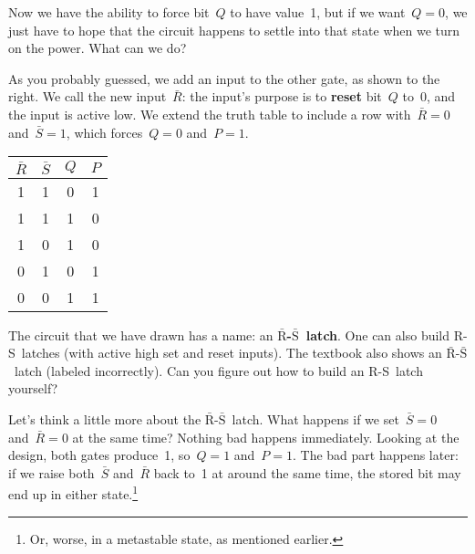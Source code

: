 \begin{minipage}{2.55in}
Now we have the ability to force bit~$Q$ to have value~1, but if we
want~$Q=0$, we just have to hope that the circuit happens to settle into
that state when we turn on the power.  What can we do?\mpline

As you probably guessed, we add an input to the other gate, as 
shown to the right.  We call the new input~$\bar{R}$: the input's
purpose is to {\bf reset} bit~$Q$ to~0, and the input
is active low.  We extend the truth table to include a row 
with~$\bar{R}=0$ and~$\bar{S}=1$, which forces~$Q=0$ and~$P=1$.
\end{minipage}\hspace{.25in}%
\begin{minipage}{2.1in}
\vspace{12pt}
\end{minipage}\hspace{.5in}%
\begin{minipage}{1.1in}
\begin{tabular}{cc|cc}
$\bar{R}$& $\bar{S}$& $Q$& $P$\\ \hline
1& 1& 0& 1\\
1& 1& 1& 0\\
1& 0& 1& 0\\
0& 1& 0& 1\\
0& 0& 1& 1
\end{tabular}\vspace{12pt}
\end{minipage}


The circuit that we have drawn has a name: an 
{\bf \mbox{$\bar{\mbox{R}}$-$\bar{\mbox{S}}$~latch}}. 
One can also build \mbox{R-S~latches} (with active high set and reset
inputs).  The textbook also shows an
\mbox{$\bar{\mbox{R}}$-$\bar{\mbox{S}}$~latch} (labeled 
incorrectly).
Can you figure out how to build an \mbox{R-S}~latch yourself?

Let's think a little more about
the \mbox{$\bar{\mbox{R}}$-$\bar{\mbox{S}}$~latch}. 
What happens if we set~$\bar{S}=0$ and~$\bar{R}=0$ at
the same time?  Nothing bad happens immediately.  Looking at the design,
both gates produce~1, so~$Q=1$ and~$P=1$.  The bad part happens later:
if we raise both~$\bar{S}$ and~$\bar{R}$ back to~1 at around
the same time, the stored bit may end up in either state.\footnote{Or,
worse, in a metastable state, as mentioned earlier.}

